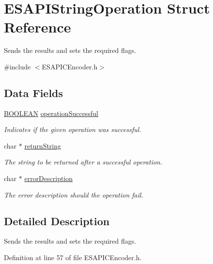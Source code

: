 \hypertarget{struct_e_s_a_p_i_string_operation}{
\section{ESAPIStringOperation Struct Reference}
\label{struct_e_s_a_p_i_string_operation}
}


Sends the results and sets the required flags.  




{\ttfamily \#include $<$ESAPICEncoder.h$>$}

\subsection*{Data Fields}
\begin{DoxyCompactItemize}
\item 
\hyperlink{_e_s_a_p_i_c_encoder_8h_aec7e62084419d7857ae740a4c68241cf}{BOOLEAN} \hyperlink{struct_e_s_a_p_i_string_operation_a99cbce009aa937a6eb09f40510a95b73}{operationSuccessful}
\begin{DoxyCompactList}\small\item\em Indicates if the given operation was successful. \end{DoxyCompactList}\item 
char $\ast$ \hyperlink{struct_e_s_a_p_i_string_operation_a020a35264b82bab27173507c25c46c6b}{returnString}
\begin{DoxyCompactList}\small\item\em The string to be returned after a successful operation. \end{DoxyCompactList}\item 
char $\ast$ \hyperlink{struct_e_s_a_p_i_string_operation_a7104ebbe41498ebd092ce412fe884b10}{errorDescription}
\begin{DoxyCompactList}\small\item\em The error description should the operation fail. \end{DoxyCompactList}\end{DoxyCompactItemize}


\subsection{Detailed Description}
Sends the results and sets the required flags. 

Definition at line 57 of file ESAPICEncoder.h.



